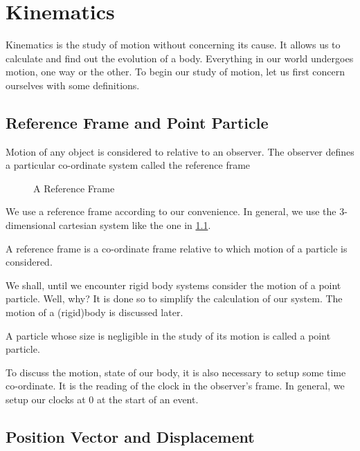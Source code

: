\chapter{Kinematics}

Kinematics is the study of motion without concerning its cause. It allows
us to calculate and find out the evolution of a body. Everything in our world undergoes
motion, one way or the other. To begin our study of motion, let us first
concern ourselves with some definitions.

\section{Reference Frame and Point Particle}

Motion of any object is considered to relative to an observer. The observer defines
a particular co-ordinate system called the reference frame

\begin{figure}[ht]
        \centering
    \caption{A Reference Frame}\label{fig: 3daxes}
\end{figure}

We use a reference frame according to our convenience. In general, we use the 3-dimensional cartesian system like the one
in \cref{fig: 3daxes}.


\begin{definition}
    A reference frame is a co-ordinate frame relative to which motion of a particle is considered.
\end{definition}

We shall, until we encounter rigid body systems consider the motion of a point particle. 
Well, why? It is done so to simplify the calculation of our system. The motion of a (rigid)body is discussed later.

\begin{definition}
    A particle whose size is negligible in the study of its motion is called a point particle.
\end{definition}

To discuss the motion, state of our body, it is also necessary to setup some time co-ordinate.
It is the reading of the clock in the observer's frame. In general, we setup our clocks
at \(0\) at the start of an event.

\section{Position Vector and Displacement}

